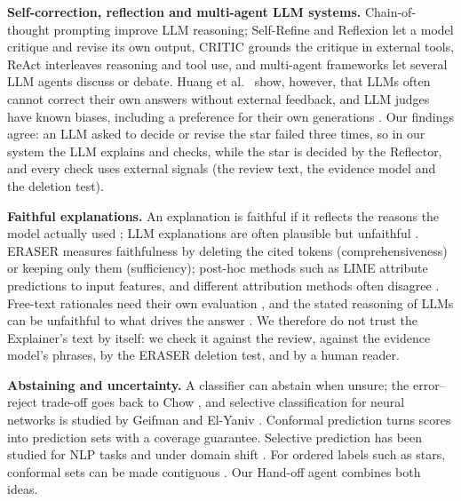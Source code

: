 \documentclass[runningheads]{llncs}
\begin{document}
\textbf{Self-correction, reflection and multi-agent LLM systems.} Chain-of-thought prompting \cite{wei2022cot,kojima2022zeroshot} improve LLM reasoning; Self-Refine \cite{madaan2023selfrefine} and Reflexion \cite{shinn2023reflexion} let a model critique and revise its own output, CRITIC \cite{gou2024critic} grounds the critique in external tools, ReAct \cite{yao2023react} interleaves reasoning and tool use, and multi-agent frameworks \cite{du2023debate,wu2023autogen} let several LLM agents discuss or debate. Huang et al.\ \cite{huang2024cannot} show, however, that LLMs often cannot correct their own answers without external feedback, and LLM judges have known biases, including a preference for their own generations \cite{zheng2023judge,panickssery2024self}. Our findings agree: an LLM asked to decide or revise the star failed three times, so in our system the LLM explains and checks, while the star is decided by the Reflector, and every check uses external signals (the review text, the evidence model and the deletion test).

\textbf{Faithful explanations.} An explanation is faithful if it reflects the reasons the model actually used \cite{jacovi2020faithfulness}; LLM explanations are often plausible but unfaithful \cite{turpin2023unfaithful}. ERASER \cite{deyoung2020eraser} measures faithfulness by deleting the cited tokens (comprehensiveness) or keeping only them (sufficiency); post-hoc methods such as LIME \cite{ribeiro2016lime} attribute predictions to input features, and different attribution methods often disagree \cite{krishna2022disagreement}. Free-text rationales need their own evaluation \cite{wiegreffe2021labels}, and the stated reasoning of LLMs can be unfaithful to what drives the answer \cite{lanham2023cotfaith}. We therefore do not trust the Explainer's text by itself: we check it against the review, against the evidence model's phrases, by the ERASER deletion test, and by a human reader.

\textbf{Abstaining and uncertainty.} A classifier can abstain when unsure; the error--reject trade-off goes back to Chow \cite{chow1970}, and selective classification for neural networks is studied by Geifman and El-Yaniv \cite{geifman2017selective}. Conformal prediction \cite{vovk2005,angelopoulos2021conformal} turns scores into prediction sets with a coverage guarantee. Selective prediction has been studied for NLP tasks \cite{varshney2022selective} and under domain shift \cite{kamath2020selective}. For ordered labels such as stars, conformal sets can be made contiguous \cite{lu2022ordinalconformal}. Our Hand-off agent combines both ideas.
\end{document}

